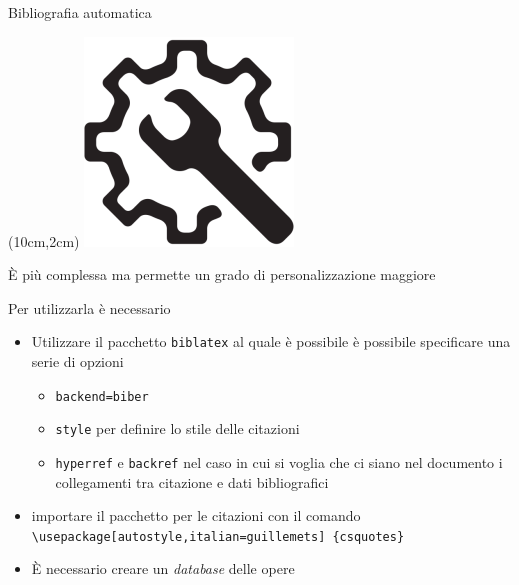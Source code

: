 \begin{frame}{Bibliografia automatica}

\begin{textblock*}{2cm}(10cm,2cm)
      \includegraphics[scale=0.28]{res/images/automatic}
\end{textblock*}

È più complessa ma permette un grado di personalizzazione maggiore

\vfill

Per utilizzarla è necessario
\begin{itemize}
	\item Utilizzare il pacchetto \texttt{biblatex} al quale è possibile è possibile specificare una serie di opzioni
	\begin{itemize}
		\item \texttt{backend=biber}
		\item \texttt{style} per definire lo stile delle citazioni
		\item \texttt{hyperref} e \texttt{backref} nel caso in cui si voglia
		che ci siano nel documento i collegamenti tra citazione e dati
		bibliografici
	\end{itemize}
	\item importare il pacchetto per le citazioni con il comando 
	\texttt{\textbackslash{}usepackage[autostyle,italian=guillemets]
	\{csquotes\}}
	\item È necessario creare un \emph{database} delle opere
\end{itemize}

\end{frame}